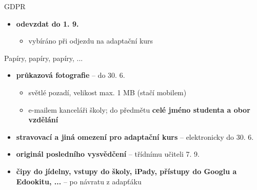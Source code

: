 \documentclass[
		czech,
		sections numbered,
		xcolor=dvipsnames,
		aspectratio=169,
]{beamer}
\begin{document}
\begin{frame}{GDPR}
		\begin{itemize}
				\item \textbf{odevzdat do \alert{1. 9.}}
						\begin{itemize}
								\item vybíráno při odjezdu na adaptační kurs
						\end{itemize}
		\end{itemize}
\end{frame}

\begin{frame}{Papíry, papíry, papíry, ...}
		\begin{itemize}
				\item \textbf<1>{průkazová fotografie} -- do \alert{30. 6.}
						\begin{itemize}
								\item světlé pozadí, velikost max. 1 MB (stačí mobilem)
								\item e-mailem kanceláři školy; do předmětu \textbf<1>{celé jméno
										studenta a obor vzdělání}
						\end{itemize}
						\pause
				\item \textbf<2>{stravovací a jiná omezení pro adaptační kurs} --
						elektronicky do \alert{30. 6.}
						\pause
				\item \textbf<3>{originál posledního vysvědčení} -- třídnímu učiteli
						\alert{7. 9.}
						\pause
				\item \textbf<4>{čipy do jídelny, vstupy do školy, iPady, přístupy do Googlu
						a Edookitu, ...} -- po návratu z adapťáku
		\end{itemize}
\end{frame}
\end{document}
